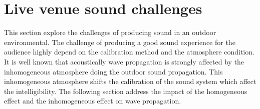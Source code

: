 \section{Live venue sound challenges}
This section explore the challenges of producing sound in an outdoor environmental. The challenge of producing a good sound experience for the audience highly depend on the calibration method and the atmosphere condition. It is well known that acoustically wave propagation is strongly affected by the inhomogeneous atmosphere doing the outdoor sound propagation. This inhomogeneous atmosphere shifts the calibration of the sound system which affect the intelligibility. The following section address the impact of the homogeneous  effect and the inhomogeneous effect on wave propagation.


